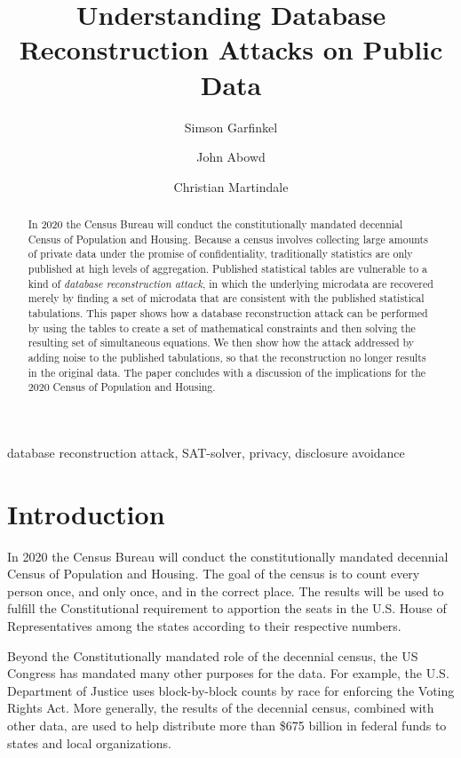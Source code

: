\documentclass[runningheads]{llncs}
\begin{document}
\title{Understanding Database Reconstruction Attacks on Public Data}
\author{Simson Garfinkel \and John Abowd \and Christian Martindale }

\maketitle
\begin{abstract}
In 2020 the Census Bureau will conduct the constitutionally mandated
decennial Census of Population and Housing. Because a census involves
collecting large amounts of private data under the promise of
confidentiality, traditionally statistics are only published at high
levels of aggregation.  Published statistical tables are vulnerable
to a kind of \emph{database reconstruction attack}, in which the
underlying microdata are recovered merely by finding a set of
microdata that are consistent with the published statistical
tabulations. This paper shows how a database reconstruction attack can
be performed by using the tables to create a set of mathematical
constraints and then solving the resulting set of simultaneous
equations.  We then show how the attack addressed by adding noise to
the published tabulations, so that the reconstruction no longer results
in the original data. The paper concludes with a discussion of the
implications for the 2020 Census of Population and Housing.
\end{abstract}

\begin{keywords}
database reconstruction attack, SAT-solver, privacy, disclosure avoidance
\end{keywords}

\section{Introduction}
In 2020 the Census Bureau will conduct the constitutionally mandated
decennial Census of Population and Housing. The goal of the census is
to count every person once, and only once, and in the correct
place. The results will be used to fulfill the Constitutional
requirement to apportion the seats in the U.S. House of
Representatives among the states according to their respective
numbers.

Beyond the Constitutionally mandated role of the decennial census, the
US Congress has mandated many other purposes for the data. For
example, the U.S. Department of Justice uses block-by-block counts by
race for enforcing the Voting Rights Act. More generally, the results
of the decennial census, combined with other data, are used to help
distribute more than \$675 billion in federal funds to states and
local organizations.
\end{document}
